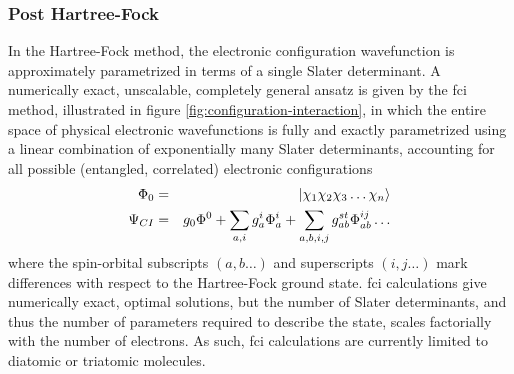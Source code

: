 \subsubsection{Post Hartree-Fock}
\label{sec:post-hartree-fock}
In the Hartree-Fock method, the electronic configuration wavefunction is  approximately parametrized in terms of a single Slater determinant. A numerically exact, unscalable, completely general ansatz is given by the \gls{fci} method, illustrated in figure \ref{fig:configuration-interaction}, in which the entire space of physical electronic wavefunctions is fully and exactly parametrized using a linear combination of exponentially many Slater determinants, accounting for all possible (entangled, correlated) electronic configurations 
\begin{eqnarray}
    \Phi_0 &=& \mbox{$ | \chi_1 \chi_2 \chi_3 \ldots \chi_n \rangle $}   \\
    \Psi_{CI} &=& g_0 \Phi^0 + \sum_{a, i}g_a^i \Phi_a^i + \sum_{a,b,i,j} g_{ab}^{st} \Phi_{ab}^{ij} \ldots
    \label{eqn:configuration-interaction}
\end{eqnarray}
where the spin-orbital subscripts $(a,b\ldots)$ and superscripts $(i,j\ldots)$ mark differences with respect to the Hartree-Fock ground state.  \gls{fci} calculations give numerically exact, optimal solutions, but the number of Slater determinants, and thus the number of parameters required to describe the state, scales factorially with the number of electrons. As such, \gls{fci} calculations are currently limited to diatomic or triatomic molecules.

